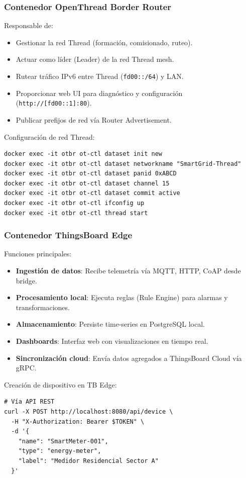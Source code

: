 \subsubsection{Contenedor OpenThread Border Router}

Responsable de:
\begin{itemize}
    \item Gestionar la red Thread (formación, comisionado, ruteo).
    \item Actuar como líder (Leader) de la red Thread mesh.
    \item Rutear tráfico IPv6 entre Thread (\texttt{fd00::/64}) y LAN.
    \item Proporcionar web UI para diagnóstico y configuración (\texttt{http://[fd00::1]:80}).
    \item Publicar prefijos de red vía Router Advertisement.
\end{itemize}

Configuración de red Thread:
\begin{verbatim}
docker exec -it otbr ot-ctl dataset init new
docker exec -it otbr ot-ctl dataset networkname "SmartGrid-Thread"
docker exec -it otbr ot-ctl dataset panid 0xABCD
docker exec -it otbr ot-ctl dataset channel 15
docker exec -it otbr ot-ctl dataset commit active
docker exec -it otbr ot-ctl ifconfig up
docker exec -it otbr ot-ctl thread start
\end{verbatim}

\subsubsection{Contenedor ThingsBoard Edge}

Funciones principales:
\begin{itemize}
    \item \textbf{Ingestión de datos}: Recibe telemetría vía MQTT, HTTP, CoAP desde bridge.
    \item \textbf{Procesamiento local}: Ejecuta reglas (Rule Engine) para alarmas y transformaciones.
    \item \textbf{Almacenamiento}: Persiste time-series en PostgreSQL local.
    \item \textbf{Dashboards}: Interfaz web con visualizaciones en tiempo real.
    \item \textbf{Sincronización cloud}: Envía datos agregados a ThingsBoard Cloud vía gRPC.
\end{itemize}

Creación de dispositivo en TB Edge:
\begin{verbatim}
# Vía API REST
curl -X POST http://localhost:8080/api/device \
  -H "X-Authorization: Bearer $TOKEN" \
  -d '{
    "name": "SmartMeter-001",
    "type": "energy-meter",
    "label": "Medidor Residencial Sector A"
  }'
\end{verbatim}

